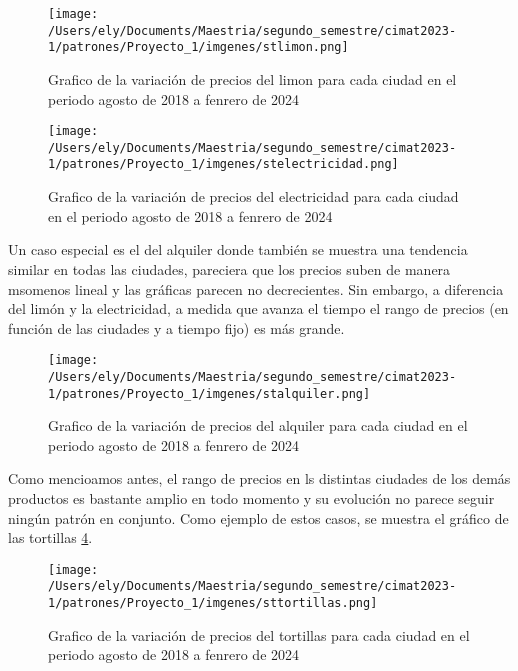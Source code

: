 \documentclass[letterpaper,spanish,reprint,nofootinbib,showkeys,aps]{revtex4-2}
\begin{document}
\begin{figure} [H]
	\begin{center}
		\texttt{[image: /Users/ely/Documents/Maestria/segundo\_semestre/cimat2023-1/patrones/Proyecto\_1/imgenes/stlimon.png]}
		\caption{Grafico de la variación de precios del limon para cada ciudad en el periodo agosto de 2018 a fenrero de 2024}
		\label{stlimon} 
   \end{center} 
\end{figure}


\begin{figure} [H]
	\begin{center}
		\texttt{[image: /Users/ely/Documents/Maestria/segundo\_semestre/cimat2023-1/patrones/Proyecto\_1/imgenes/stelectricidad.png]}
		\caption{Grafico de la variación de precios del electricidad para cada ciudad en el periodo agosto de 2018 a fenrero de 2024}
		\label{stelectricidad} 
   \end{center} 
\end{figure}

Un caso especial es el del alquiler donde también se muestra una tendencia similar en todas las ciudades, pareciera que los precios suben de manera msomenos lineal y las gráficas parecen no decrecientes. Sin embargo, a diferencia del limón y la electricidad, a medida que avanza el tiempo el rango de precios (en función de las ciudades y a tiempo fijo) es más grande. 

\begin{figure} [H]
	\begin{center}
		\texttt{[image: /Users/ely/Documents/Maestria/segundo\_semestre/cimat2023-1/patrones/Proyecto\_1/imgenes/stalquiler.png]}
		\caption{Grafico de la variación de precios del alquiler para cada ciudad en el periodo agosto de 2018 a fenrero de 2024}
		\label{stalquiler} 
   \end{center} 
\end{figure}

Como mencioamos antes, el rango de precios en ls distintas ciudades de los demás productos es bastante amplio en todo momento y su evolución no parece seguir ningún patrón en conjunto. Como ejemplo de estos casos, se muestra el gráfico de las tortillas \ref{sttortillas}.

\begin{figure} [H]
	\begin{center}
		\texttt{[image: /Users/ely/Documents/Maestria/segundo\_semestre/cimat2023-1/patrones/Proyecto\_1/imgenes/sttortillas.png]}
		\caption{Grafico de la variación de precios del tortillas para cada ciudad en el periodo agosto de 2018 a fenrero de 2024}
		\label{sttortillas} 
   \end{center} 
\end{figure} 
\end{document}
